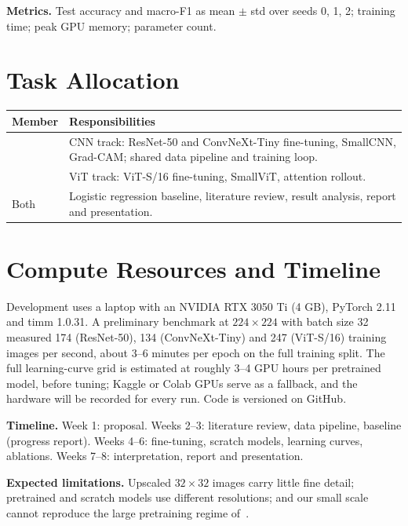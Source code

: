 \documentclass[10pt,a4paper]{article}
\begin{document}
\textbf{Metrics.} Test accuracy and macro-F1 as mean $\pm$ std over seeds 0, 1, 2; training time;
peak GPU memory; parameter count.

\section{Task Allocation}
\begin{tabularx}{\linewidth}{@{}lX@{}}
\toprule
\textbf{Member} & \textbf{Responsibilities} \\
\midrule
[Member 1] & CNN track: ResNet-50 and ConvNeXt-Tiny fine-tuning, SmallCNN, Grad-CAM; shared data
pipeline and training loop. \\
[Member 2] & ViT track: ViT-S/16 fine-tuning, SmallViT, attention rollout. \\
Both & Logistic regression baseline, literature review, result analysis, report and presentation. \\
\bottomrule
\end{tabularx}

\section{Compute Resources and Timeline}
Development uses a laptop with an NVIDIA RTX 3050 Ti (4 GB), PyTorch 2.11 and timm 1.0.31. A
preliminary benchmark at $224\times224$ with batch size 32 measured 174 (ResNet-50), 134
(ConvNeXt-Tiny) and 247 (ViT-S/16) training images per second, about 3--6 minutes per epoch on
the full training split. The full learning-curve grid is estimated at roughly 3--4 GPU hours per
pretrained model, before tuning; Kaggle or Colab GPUs serve as a fallback, and the hardware will be
recorded for every run. Code is versioned on GitHub.

\textbf{Timeline.} Week 1: proposal. Weeks 2--3: literature review, data pipeline, baseline
(progress report). Weeks 4--6: fine-tuning, scratch models, learning curves, ablations.
Weeks 7--8: interpretation, report and presentation.

\textbf{Expected limitations.} Upscaled $32\times32$ images carry little fine detail; pretrained
and scratch models use different resolutions; and our small scale cannot reproduce the large
pretraining regime of~\cite{dosovitskiy2021vit}.
\end{document}
